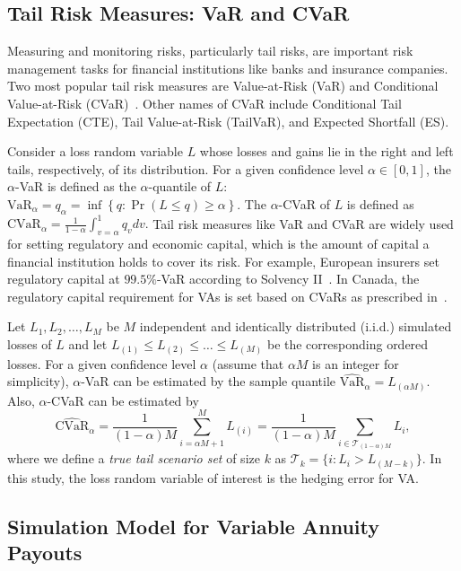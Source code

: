 \documentclass{article}
\newcommand{\VaR}{\mbox{VaR}}
\newcommand{\CVaR}{\mbox{CVaR}}
\newcommand{\tail}{\mathcal{T}}
\begin{document}
\subsection{Tail Risk Measures: VaR and CVaR}
Measuring and monitoring risks, particularly tail risks, are important risk management tasks for financial institutions like banks and insurance companies.
Two most popular tail risk measures are Value-at-Risk (VaR) and Conditional Value-at-Risk (CVaR)~\citep{rockafellar2002conditional}. Other names of CVaR include Conditional Tail Expectation (CTE), Tail Value-at-Risk (TailVaR), and Expected Shortfall (ES).

Consider a loss random variable $L$ whose losses and gains lie in the right and left tails, respectively, of its distribution.
For a given confidence level $\alpha\in [0,1]$, the $\alpha$-VaR is defined as the $\alpha$-quantile of $L$:
$
    \VaR_\alpha = q_\alpha = \inf \left\{ q: \Pr(L\leq q) \geq \alpha \right\}.
$
The $\alpha$-CVaR of $L$ is defined as
$
    \CVaR_\alpha =\frac{1}{1-\alpha} \int_{v=\alpha}^{1} q_v dv.
$
Tail risk measures like VaR and CVaR are widely used for setting regulatory and economic capital, which is the amount of capital a financial institution holds to cover its risk.
For example, European insurers set regulatory capital at $99.5\%$-VaR according to Solvency II~\cite{eiopa2014underlying}.
In Canada, the regulatory capital requirement for VAs is set based on CVaRs as prescribed in~\cite{osfi2017life}.

Let $L_1,L_2,\ldots,L_M$ be $M$ independent and identically distributed (i.i.d.) simulated losses of $L$ and let $L_{(1)}\leq L_{(2)}\leq \ldots\leq L_{(M)}$ be the corresponding ordered losses.
For a given confidence level $\alpha$ (assume that $\alpha M$ is an integer for simplicity), $\alpha$-VaR can be estimated by the sample quantile $\widehat{\VaR}_\alpha = L_{(\alpha M)}$. Also, $\alpha$-CVaR can be estimated by
\begin{equation*}
    \widehat{\CVaR}_\alpha = \frac{1}{(1-\alpha)M} \sum_{i=\alpha M + 1}^{M}L_{(i)} = \frac{1}{(1-\alpha)M} \sum_{i \in \tail_{(1-\alpha )M}}L_{i},
\end{equation*}
where we define a \textit{true tail scenario set} of size $k$ as $\tail_{k} = \{i: L_i > L_{(M-k)}\}$.
In this study, the loss random variable of interest is the hedging error for VA.

\subsection{Simulation Model for Variable Annuity Payouts}\label{subsec:VApayout}
\end{document}
